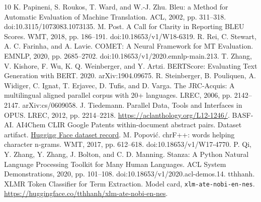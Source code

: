 \begin{thebibliography}{10}
 K. Papineni, S. Roukos, T. Ward, and W.-J. Zhu.
Bleu: a Method for Automatic Evaluation of Machine Translation. ACL, 2002, pp. 311--318.
doi:10.3115/1073083.1073135.
 M. Post. A Call for Clarity in Reporting BLEU Scores.
WMT, 2018, pp. 186--191. doi:10.18653/v1/W18-6319.
 R. Rei, C. Stewart, A. C. Farinha, and A. Lavie.
COMET: A Neural Framework for MT Evaluation. EMNLP, 2020, pp. 2685--2702.
doi:10.18653/v1/2020.emnlp-main.213.
 T. Zhang, V. Kishore, F. Wu, K. Q. Weinberger, and Y. Artzi.
BERTScore: Evaluating Text Generation with BERT. 2020. arXiv:1904.09675.
 R. Steinberger, B. Pouliquen, A. Widiger, C. Ignat,
T. Erjavec, D. Tufis, and D. Varga. The JRC-Acquis: A multilingual aligned parallel corpus
with 20+ languages. LREC, 2006, pp. 2142--2147. arXiv:cs/0609058.
 J. Tiedemann. Parallel Data, Tools and Interfaces in OPUS.
LREC, 2012, pp. 2214--2218. \url{https://aclanthology.org/L12-1246/}.
 BASF-AI. AI4Chem CLIR Google Patents within-document abstract pairs.
Dataset artifact.
\href{https://huggingface.co/datasets/BASF-AI/ai4chem-clir-google-patents-within-document-abstract-pairs}{Hugging Face dataset record}.
 M. Popovi\'{c}. chrF++: words helping character n-grams.
WMT, 2017, pp. 612--618. doi:10.18653/v1/W17-4770.
 P. Qi, Y. Zhang, Y. Zhang, J. Bolton, and C. D. Manning.
Stanza: A Python Natural Language Processing Toolkit for Many Human Languages.
ACL System Demonstrations, 2020, pp. 101--108. doi:10.18653/v1/2020.acl-demos.14.
 tthhanh. XLMR Token Classifier for Term Extraction.
Model card, \texttt{xlm-ate-nobi-en-nes}.
\url{https://huggingface.co/tthhanh/xlm-ate-nobi-en-nes}.
\end{thebibliography}
